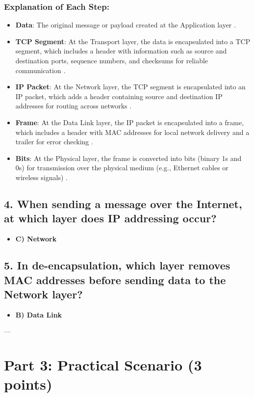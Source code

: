 \documentclass{article}
\begin{document}
\subsubsection*{Explanation of Each Step:}
\begin{itemize}
    \item \textbf{Data}: The original message or payload created at the Application layer \cite{gfg1}.
    \item \textbf{TCP Segment}: At the Transport layer, the data is encapsulated into a TCP segment, which includes a header with information such as source and destination ports, sequence numbers, and checksums for reliable communication \cite{gfg2}.
    \item \textbf{IP Packet}: At the Network layer, the TCP segment is encapsulated into an IP packet, which adds a header containing source and destination IP addresses for routing across networks \cite{gfg2}.
    \item \textbf{Frame}: At the Data Link layer, the IP packet is encapsulated into a frame, which includes a header with MAC addresses for local network delivery and a trailer for error checking \cite{fcc}.
    \item \textbf{Bits}: At the Physical layer, the frame is converted into bits (binary 1s and 0s) for transmission over the physical medium (e.g., Ethernet cables or wireless signals) \cite{fcc}.
\end{itemize}

\subsection*{4. When sending a message over the Internet, at which layer does IP addressing occur?}
\begin{itemize}
    \item \textbf{C) Network} \cite{gfg2}
\end{itemize}

\subsection*{5. In de-encapsulation, which layer removes MAC addresses before sending data to the Network layer?}
\begin{itemize}
    \item \textbf{B) Data Link} \cite{fcc}
\end{itemize}

---

\section*{Part 3: Practical Scenario (3 points)}
\end{document}
